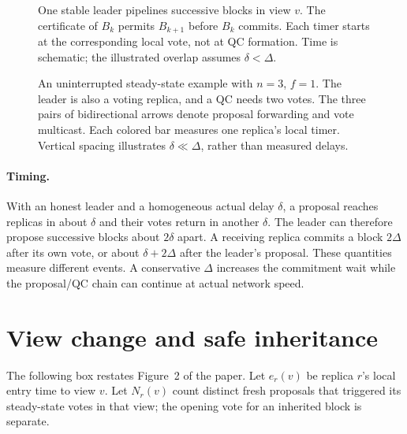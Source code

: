 \documentclass[11pt,a4paper]{article}
\begin{document}
\begin{figure}[H]\centering

\caption{One stable leader pipelines successive blocks in view $v$.
The certificate of $B_k$ permits $B_{k+1}$ before $B_k$ commits.
Each timer starts at the corresponding local vote, not at QC formation.
Time is schematic; the illustrated overlap assumes $\delta<\Delta$.}
\label{fig:pipeline}
\end{figure}

\begin{figure}[H]\centering

\caption{An uninterrupted steady-state example with $n=3$, $f=1$.
The leader is also a voting replica, and a QC needs two votes.
The three pairs of bidirectional arrows denote proposal forwarding and
vote multicast. Each colored bar measures one replica's local timer.
Vertical spacing illustrates $\delta\ll\Delta$, rather than measured
delays.}
\label{fig:communication}
\end{figure}

\paragraph{Timing.}
With an honest leader and a homogeneous actual delay $\delta$, a
proposal reaches replicas in about $\delta$ and their votes return in
another $\delta$. The leader can therefore propose successive blocks
about $2\delta$ apart. A receiving replica commits a block $2\Delta$
after its own vote, or about $\delta+2\Delta$ after the leader's
proposal. These quantities measure different events. A conservative
$\Delta$ increases the commitment wait while the proposal/QC chain can
continue at actual network speed.

\section{View change and safe inheritance}
\label{sec:change}
The following box restates Figure~2 of the paper. Let $e_r(v)$ be
replica $r$'s local entry time to view $v$. Let $N_r(v)$ count distinct
fresh proposals that triggered its steady-state votes in that view;
the opening vote for an inherited block is separate.
\end{document}
